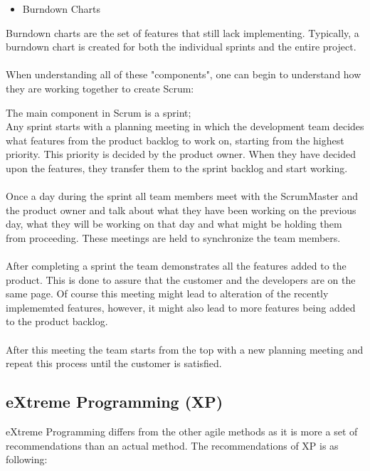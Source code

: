 \begin{itemize}
	\item Burndown Charts
\end{itemize}
Burndown charts are the set of features that still lack implementing. Typically, a burndown chart is created for both the individual sprints and the entire project.\\
\\
When understanding all of these "components", one can begin to understand how they are working together to create Scrum:

The main component in Scrum is a sprint; \\
Any sprint starts with a planning meeting in which the development team decides what features from the product backlog to work on, starting from the highest priority. This priority is decided by the product owner. When they have decided upon the features, they transfer them to the sprint backlog and start working. \\
\\
Once a day during the sprint all team members meet with the ScrumMaster and the product owner and talk about what they have been working on the previous day, what they will be working on that day and what might be holding them from proceeding. These meetings are held to synchronize the team members.\\
\\
After completing a sprint the team demonstrates all the features added to the product. This is done to assure that the customer and the developers are on the same page. Of course this meeting might lead to alteration of the recently implememted features, however, it might also lead to more features being added to the product backlog.\\
\\
After this meeting the team starts from the top with a new planning meeting and repeat this process until the customer is satisfied.

\subsection{eXtreme Programming (XP)}
eXtreme Programming differs from the other agile methods as it is more a set of recommendations than an actual method. The recommendations of XP is as following:


